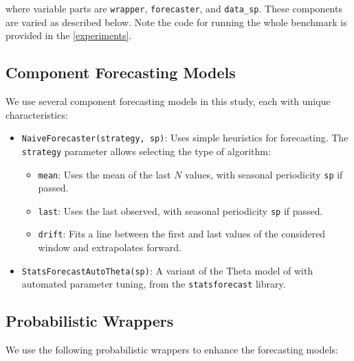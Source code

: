 where variable parts are \texttt{wrapper}, \texttt{forecaster}, and \texttt{data\_sp}. These components are varied as described below.
Note the code for running the whole benchmark is provided in the \autoref{experiments}.

\subsection{Component Forecasting Models}

We use several component forecasting models in this study, each with unique characteristics:

\begin{itemize}
    \item \texttt{NaiveForecaster(strategy, sp)}: Uses simple heuristics for forecasting. The \texttt{strategy} parameter allows selecting the type of algorithm:
    \begin{itemize}
        \item \texttt{mean}: Uses the mean of the last \(N\) values, with seasonal periodicity \texttt{sp} if passed.
        \item \texttt{last}: Uses the last observed, with seasonal periodicity \texttt{sp} if passed.
        \item \texttt{drift}: Fits a line between the first and last values of the considered window and extrapolates forward.
    \end{itemize}

    \item \texttt{StatsForecastAutoTheta(sp)}: A variant of the Theta model of \cite{Assimakopoulos2000} with automated parameter tuning, from the \texttt{statsforecast} library.

\end{itemize}

\subsection{Probabilistic Wrappers}
We use the following probabilistic wrappers to enhance the forecasting models:

